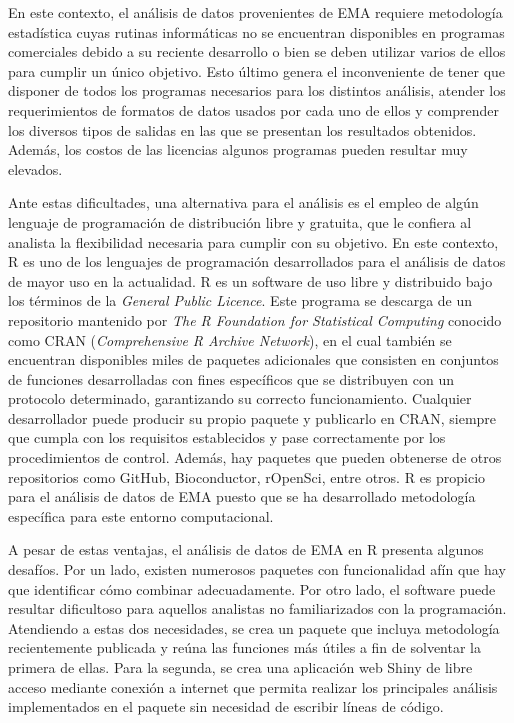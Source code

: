 En este contexto, el análisis de datos provenientes de EMA requiere metodología estadística cuyas rutinas informáticas no se encuentran disponibles en programas comerciales debido a su reciente desarrollo o bien se deben utilizar varios de ellos para cumplir un único objetivo. Esto último genera el inconveniente de tener que disponer de todos los programas necesarios para los distintos análisis, atender los requerimientos de formatos de datos usados por cada uno de ellos y comprender los diversos tipos de salidas en las que se presentan los resultados obtenidos. Además, los costos de las licencias algunos programas pueden resultar muy elevados. 

Ante estas dificultades, una alternativa para el análisis es el empleo de algún lenguaje de programación de distribución libre y gratuita, que le confiera al analista la flexibilidad necesaria para cumplir con su objetivo. En este contexto, R es uno de los lenguajes de programación desarrollados para el análisis de datos de mayor uso en la actualidad. R es un software de uso libre y distribuido bajo los términos de la \emph{General Public Licence}. Este programa se descarga de un repositorio mantenido por \emph{The R Foundation for Statistical Computing} conocido como CRAN (\emph{Comprehensive R Archive Network}), en el cual también se encuentran disponibles miles de paquetes adicionales que consisten en conjuntos de funciones desarrolladas con fines específicos que se distribuyen con un protocolo determinado, garantizando su correcto funcionamiento. Cualquier desarrollador puede producir su propio paquete y publicarlo en CRAN, siempre que cumpla con los requisitos establecidos y pase correctamente por los procedimientos de control. Además, hay paquetes que pueden obtenerse de otros repositorios como GitHub, Bioconductor, rOpenSci, entre otros. R es propicio para el análisis de datos de EMA puesto que se ha desarrollado metodología específica para este entorno computacional. 

A pesar de estas ventajas, el análisis de datos de EMA en R presenta algunos desafíos. Por un lado, existen numerosos paquetes con funcionalidad afín que hay que identificar cómo combinar adecuadamente. Por otro lado, el software puede resultar dificultoso para aquellos analistas no familiarizados con la programación. Atendiendo a estas dos necesidades, se crea un paquete que incluya metodología recientemente publicada y reúna las funciones más útiles a fin de solventar la primera de ellas. Para la segunda, se crea una aplicación web Shiny de libre acceso mediante conexión a internet que permita realizar los principales análisis implementados en el paquete sin necesidad de escribir líneas de código. 
